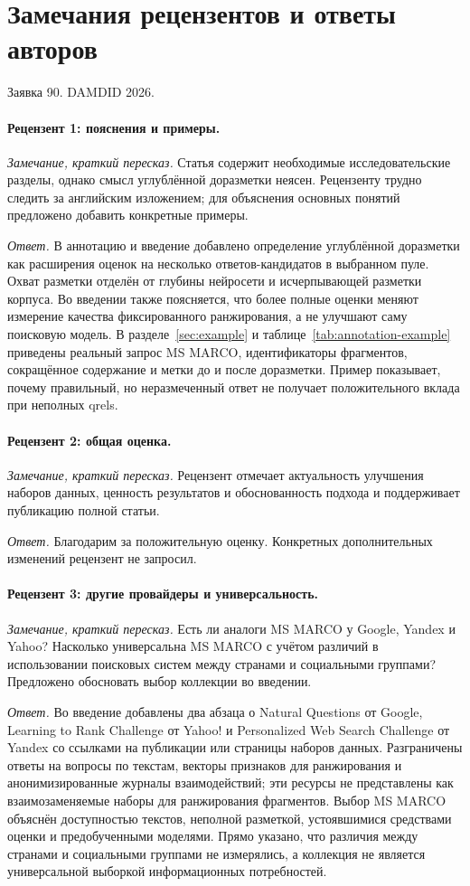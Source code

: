 \section*{Замечания рецензентов и ответы авторов}
\noindent Заявка 90. DAMDID 2026.

\paragraph{Рецензент 1: пояснения и примеры.}
\emph{Замечание, краткий пересказ.} Статья содержит необходимые исследовательские разделы, однако смысл углублённой доразметки неясен. Рецензенту трудно следить за английским изложением; для объяснения основных понятий предложено добавить конкретные примеры.

\emph{Ответ.} В аннотацию и введение добавлено определение углублённой доразметки как расширения оценок на несколько ответов-кандидатов в выбранном пуле. Охват разметки отделён от глубины нейросети и исчерпывающей разметки корпуса. Во введении также поясняется, что более полные оценки меняют измерение качества фиксированного ранжирования, а не улучшают саму поисковую модель. В разделе~\ref{sec:example} и таблице~\ref{tab:annotation-example} приведены реальный запрос MS MARCO, идентификаторы фрагментов, сокращённое содержание и метки до и после доразметки. Пример показывает, почему правильный, но неразмеченный ответ не получает положительного вклада при неполных qrels.

\paragraph{Рецензент 2: общая оценка.}
\emph{Замечание, краткий пересказ.} Рецензент отмечает актуальность улучшения наборов данных, ценность результатов и обоснованность подхода и поддерживает публикацию полной статьи.

\emph{Ответ.} Благодарим за положительную оценку. Конкретных дополнительных изменений рецензент не запросил.

\paragraph{Рецензент 3: другие провайдеры и универсальность.}
\emph{Замечание, краткий пересказ.} Есть ли аналоги MS MARCO у Google, Yandex и Yahoo? Насколько универсальна MS MARCO с учётом различий в использовании поисковых систем между странами и социальными группами? Предложено обосновать выбор коллекции во введении.

\emph{Ответ.} Во введение добавлены два абзаца о Natural Questions от Google, Learning to Rank Challenge от Yahoo! и Personalized Web Search Challenge от Yandex со ссылками на публикации или страницы наборов данных. Разграничены ответы на вопросы по текстам, векторы признаков для ранжирования и анонимизированные журналы взаимодействий; эти ресурсы не представлены как взаимозаменяемые наборы для ранжирования фрагментов. Выбор MS MARCO объяснён доступностью текстов, неполной разметкой, устоявшимися средствами оценки и предобученными моделями. Прямо указано, что различия между странами и социальными группами не измерялись, а коллекция не является универсальной выборкой информационных потребностей.
